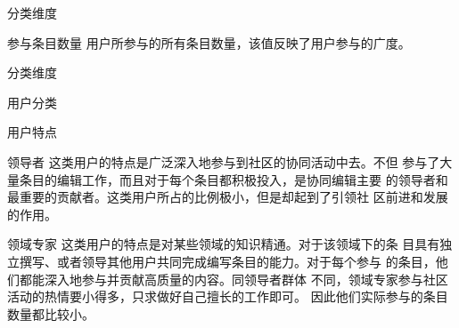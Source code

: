 \documentclass[slidestop,compress,mathserif,table]{beamer}
\begin{document}
 \begin{frame}{分类维度}
    \begin{block}{参与条目数量}
     用户所参与的所有条目数量，该值反映了用户参与的广度。
   \end{block}
\scalebox{0.77}{ }  
 \end{frame}

 \begin{frame}{分类维度}
 
\scalebox{0.77}{ }  
 \end{frame}

 \begin{frame}{用户分类}
 \end{frame}

 \begin{frame}{用户特点}
   \begin{block}{ 领导者}
    这类用户的特点是广泛深入地参与到社区的协同活动中去。不但
  参与了大量条目的编辑工作，而且对于每个条目都积极投入，是协同编辑主要
  的领导者和最重要的贡献者。这类用户所占的比例极小，但是却起到了引领社
  区前进和发展的作用。
   \end{block}

   \begin{block}{领域专家}
     这类用户的特点是对某些领域的知识精通。对于该领域下的条
  目具有独立撰写、或者领导其他用户共同完成编写条目的能力。对于每个参与
  的条目，他们都能深入地参与并贡献高质量的内容。同领导者群体
  不同，领域专家参与社区活动的热情要小得多，只求做好自己擅长的工作即可。
  因此他们实际参与的条目数量都比较小。
   \end{block}
 \end{frame}
\end{document}
